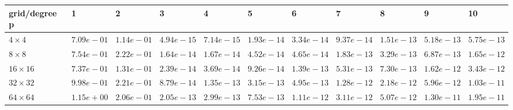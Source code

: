 \begin{tabular}{lllllllllll}
\hline
 grid/degree p   & 1          & 2          & 3          & 4          & 5          & 6          & 7          & 8          & 9          & 10         \\
\hline
 $4 \times 4$    & $7.09e-01$ & $1.14e-01$ & $4.94e-15$ & $7.14e-15$ & $1.93e-14$ & $3.34e-14$ & $9.37e-14$ & $1.51e-13$ & $5.18e-13$ & $5.75e-13$ \\
 $8 \times 8$    & $7.54e-01$ & $2.22e-01$ & $1.64e-14$ & $1.67e-14$ & $4.52e-14$ & $4.65e-14$ & $1.83e-13$ & $3.29e-13$ & $6.87e-13$ & $1.65e-12$ \\
 $16 \times 16$  & $7.37e-01$ & $1.31e-01$ & $2.39e-14$ & $3.69e-14$ & $9.26e-14$ & $1.39e-13$ & $5.31e-13$ & $7.30e-13$ & $1.62e-12$ & $3.43e-12$ \\
 $32 \times 32$  & $9.98e-01$ & $2.21e-01$ & $8.79e-14$ & $1.35e-13$ & $3.15e-13$ & $4.95e-13$ & $1.28e-12$ & $2.18e-12$ & $5.96e-12$ & $1.03e-11$ \\
 $64 \times 64$  & $1.15e+00$ & $2.06e-01$ & $2.05e-13$ & $2.99e-13$ & $7.53e-13$ & $1.11e-12$ & $3.11e-12$ & $5.07e-12$ & $1.30e-11$ & $1.95e-11$ \\
\hline
\end{tabular}